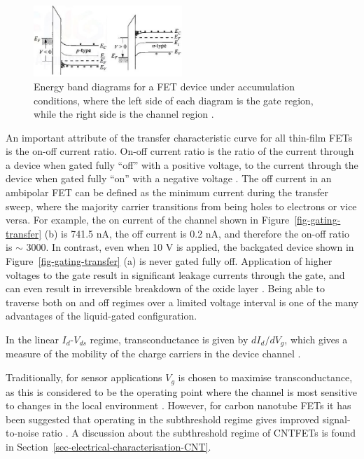 \documentclass[
  a4paper,
]{scrbook}
\begin{document}
\begin{figure}

{\centering \includegraphics[width=0.5\textwidth,height=\textheight]{figures/ch2/accumulation.png}

}

\caption{\label{fig-accumulation}Energy band diagrams for a FET device
under accumulation conditions, where the left side of each diagram is
the gate region, while the right side is the channel region
\autocite{Sze2006}.}

\end{figure}

An important attribute of the transfer characteristic curve for all
thin-film FETs is the on-off current ratio. On-off current ratio is the
ratio of the current through a device when gated fully ``off'' with a
positive voltage, to the current through the device when gated fully
``on'' with a negative voltage \autocite{Zheng2017}. The off current in
an ambipolar FET can be defined as the minimum current during the
transfer sweep, where the majority carrier transitions from being holes
to electrons or vice versa. For example, the on current of the channel
shown in Figure~\ref{fig-gating-transfer} (b) is 741.5 nA, the off
current is 0.2 nA, and therefore the on-off ratio is \(\sim\) 3000. In
contrast, even when 10 V is applied, the backgated device shown in
Figure~\ref{fig-gating-transfer} (a) is never gated fully off.
Application of higher voltages to the gate result in significant leakage
currents through the gate, and can even result in irreversible breakdown
of the oxide layer \autocite{Sze2006}. Being able to traverse both on
and off regimes over a limited voltage interval is one of the many
advantages of the liquid-gated configuration.

In the linear \(I_d\)-\(V_{ds}\) regime, transconductance is given by
\(dI_{d}/dV_g\), which gives a measure of the mobility of the charge
carriers in the device channel \autocite{Martel1998,Sze2006,Zheng2017}.

Traditionally, for sensor applications \(V_g\) is chosen to maximise
transconductance, as this is considered to be the operating point where
the channel is most sensitive to changes in the local environment
\autocite{Ohno2010a,Choi2012}. However, for carbon nanotube FETs it has
been suggested that operating in the subthreshold regime gives improved
signal-to-noise ratio \autocite{Heller2009}. A discussion about the
subthreshold regime of CNTFETs is found in
Section~\ref{sec-electrical-characterisation-CNT}.
\end{document}
